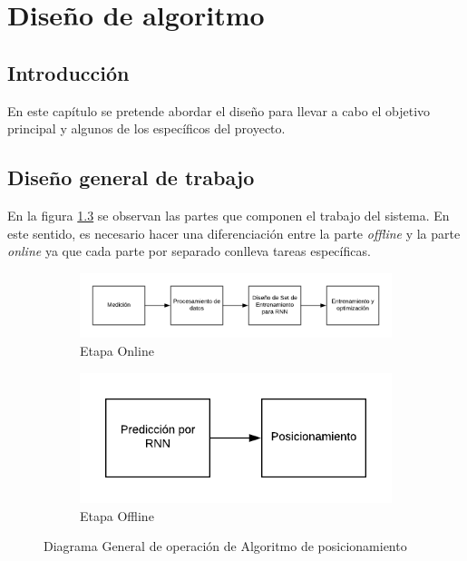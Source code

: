 \chapter{Diseño de algoritmo}
\section{Introducción}
En este capítulo se pretende abordar el diseño para llevar a cabo el objetivo principal y algunos de los específicos del proyecto.

\section{Diseño general de trabajo}
En la figura \ref{fig:esquema} se observan las partes que componen el trabajo del sistema. En este sentido, es necesario hacer una diferenciación entre la parte \textit{offline} y la parte \textit{online} ya que cada parte por separado conlleva tareas específicas.

\begin{figure}[h!]
    \centering
    \begin{subfigure}[b]{0.7\textwidth}
        \includegraphics[width=\textwidth]{./images/online}
        \caption{Etapa Online}
        \label{fig:Online}
    \end{subfigure}
    
    \begin{subfigure}[b]{0.4\textwidth}
        \includegraphics[width=\textwidth]{./images/offline}
        \caption{Etapa Offline}
        \label{fig:offline}
    \end{subfigure}
    \caption{Diagrama General de operación de Algoritmo de posicionamiento}
    \label{fig:esquema}
\end{figure}

